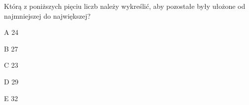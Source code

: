 \begin{tresc}
Którą z poniższych pięciu liczb należy wykreślić, aby pozostałe były ułożone od najmniejszej do największej?
\end{tresc}
\begin{wariant}{A} 24 \end{wariant}
\begin{wariant}{B} 27 \end{wariant}
\begin{wariant}{C} 23 \end{wariant}
\begin{wariant}{D} 29 \end{wariant}
\begin{wariant}{E} 32 \end{wariant}
